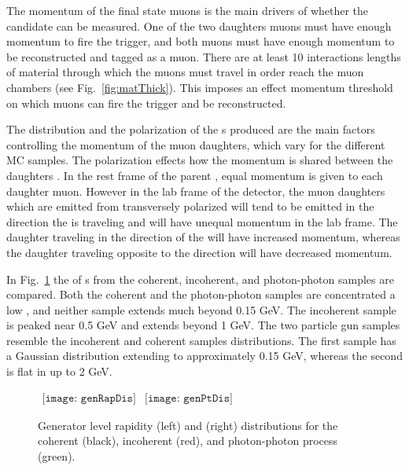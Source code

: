     The momentum of the final state muons is the main drivers of whether the 
      candidate can be measured.
    One of the two daughters muons must have enough momentum to fire the 
      trigger, and both muons  must have enough momentum to be 
      reconstructed and tagged as a muon. 
    There are at least 10 interactions lengths of material through which the 
      muons must travel in order reach the muon chambers 
      (see Fig.~\ref{fig:matThick}).
    This imposes an effect momentum threshold on which muons can fire the 
      trigger and be reconstructed. 

    The \pt{} distribution and the polarization of the \JPsi{}s produced are 
      the main factors controlling the momentum of the muon daughters, which
      vary for the different MC samples. 
    The polarization effects how the momentum is shared between the daughters
      \cite{oniaPol}.
    In the rest frame of the parent \JPsi{}, equal momentum is given to each 
      daughter muon. 
    However in the lab frame of the detector, the muon daughters which are 
      emitted from transversely polarized \JPsi{} will tend to be emitted in
      the direction the \JPsi{} is traveling and will have unequal momentum in 
      the lab frame.
    The daughter traveling in the direction of the \JPsi{} will have increased
      momentum, whereas the daughter traveling opposite to the \JPsi{} 
      direction will have decreased momentum. 

    In Fig.~\ref{fig:starlightRapPtDist} the \pt{} of \JPsi{}s from the 
      coherent, incoherent, and photon-photon samples are compared.
    Both the coherent and the photon-photon samples are concentrated a low 
      \pt{}, and neither sample extends much beyond 0.15 GeV.
    The incoherent sample is peaked near 0.5 GeV and extends beyond 1 GeV.
    The two particle gun samples resemble the incoherent and coherent samples
      \pt{} distributions.
    The first sample has a Gaussian \pt{} distribution extending to 
      approximately 0.15 GeV, whereas the second is flat in \pt{} up to
      2 GeV.


    \begin{figure}[!Hhbt]
      \centering
      $ \begin{array}{cc}
        \texttt{[image: genRapDis]} &
        \texttt{[image: genPtDis]}
      \end{array} $
      \caption{Generator level rapidity (left) and \pt{} (right) 
          distributions for the coherent (black), incoherent (red), 
          and photon-photon process (green).}
      \label{fig:starlightRapPtDist}
    \end{figure}
    
